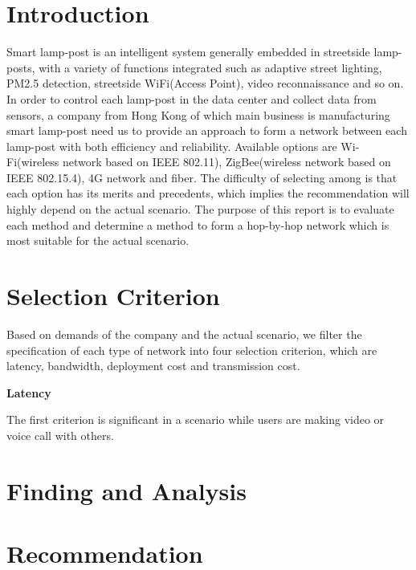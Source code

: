 \documentclass[12pt]{article}
\begin{document}
	\section{Introduction}
	Smart lamp-post is an intelligent system generally embedded in streetside lamp-posts, with a variety of functions integrated such as adaptive street lighting, PM2.5 detection, streetside WiFi(Access Point), video reconnaissance and so on. In order to control each lamp-post in the data center and collect data from sensors, a company from Hong Kong of which main business is manufacturing smart lamp-post need us to provide an approach to form a network between each lamp-post with both efficiency and reliability. Available options are Wi-Fi(wireless network based on IEEE 802.11), ZigBee(wireless network based on IEEE 802.15.4), 4G network and fiber. The difficulty of selecting among is that each option has its merits and precedents, which implies the recommendation will highly depend on the actual scenario. The purpose of this report is to evaluate each method and determine a method to form a hop-by-hop network which is most suitable for the actual scenario.
	
	\section{Selection Criterion}
	Based on demands of the company and the actual scenario, we filter the specification of each type of network into four selection criterion, which are latency, bandwidth, deployment cost and transmission cost. \\ \par 
	
	\textbf{Latency} \par 
	The first criterion is significant in a scenario while users are making video or voice call with others. 
	
	\section{Finding and Analysis}
	
	
	\section{Recommendation}
	
	
\end{document}
